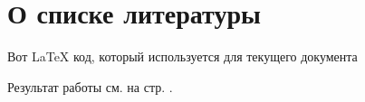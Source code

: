 \section{О списке литературы}

\noindent
Вот \LaTeX{} код, который используется для текущего документа

%
%


\bigskip

Результат работы см. на стр. \pageref{thebibliography}.

\clearpage